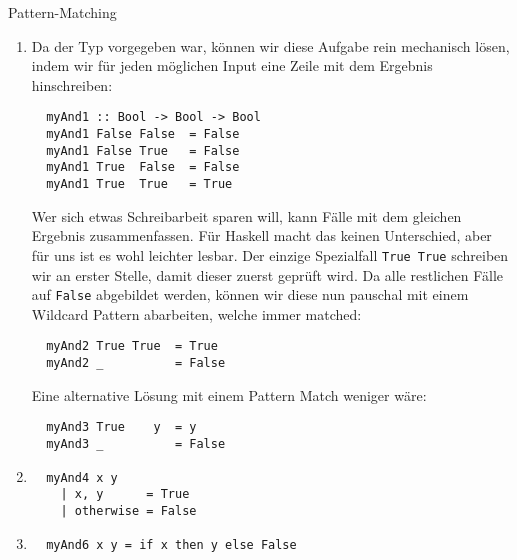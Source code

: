 \documentclass[11pt]{article}
\begin{document}
\begin{aufgabe}{Pattern-Matching}
  \begin{loesung}
    \begin{enumerate}
      \item Da der Typ vorgegeben war, können wir diese Aufgabe rein mechanisch lösen,
      indem wir für jeden möglichen Input eine Zeile mit dem Ergebnis hinschreiben:
    \begin{verbatim}
  myAnd1 :: Bool -> Bool -> Bool
  myAnd1 False False  = False    
  myAnd1 False True   = False
  myAnd1 True  False  = False
  myAnd1 True  True   = True  
    \end{verbatim}
    Wer sich etwas Schreibarbeit sparen will, kann Fälle mit dem gleichen Ergebnis zusammenfassen.
    Für Haskell macht das keinen Unterschied, aber für uns ist es wohl leichter lesbar.
    Der einzige Spezialfall \verb|True True| schreiben wir an erster Stelle, damit dieser zuerst geprüft wird.
    Da alle restlichen Fälle auf \verb|False| abgebildet werden, können wir 
    diese nun pauschal mit einem Wildcard Pattern abarbeiten, welche immer matched:    
    \begin{verbatim}
  myAnd2 True True  = True 
  myAnd2 _          = False
    \end{verbatim}
    Eine alternative Lösung mit einem Pattern Match weniger wäre:
    \begin{verbatim}
  myAnd3 True    y  = y
  myAnd3 _          = False
    \end{verbatim}
      \item 
      \begin{verbatim}
  myAnd4 x y  
    | x, y      = True
    | otherwise = False
      \end{verbatim}
%       
        \item
        \begin{verbatim}
  myAnd6 x y = if x then y else False 
    \end{verbatim}
\end{enumerate}
  \end{loesung}
\end{aufgabe}
\end{document}
